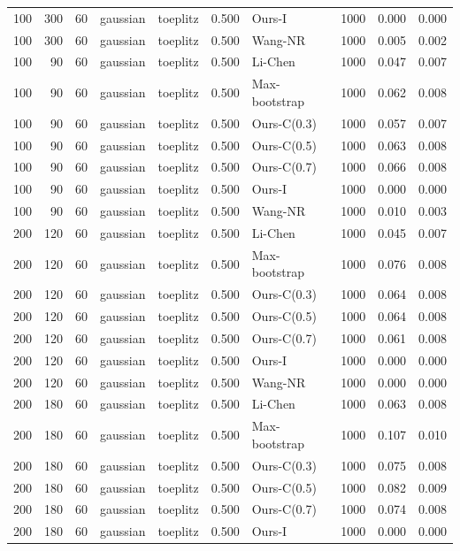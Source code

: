\begin{tabular}{rrrllrlrrr}
100 & 300 & 60 & gaussian & toeplitz & 0.500 & Ours-I & 1000 & 0.000 & 0.000 \\
100 & 300 & 60 & gaussian & toeplitz & 0.500 & Wang-NR & 1000 & 0.005 & 0.002 \\
100 & 90 & 60 & gaussian & toeplitz & 0.500 & Li-Chen & 1000 & 0.047 & 0.007 \\
100 & 90 & 60 & gaussian & toeplitz & 0.500 & Max-bootstrap & 1000 & 0.062 & 0.008 \\
100 & 90 & 60 & gaussian & toeplitz & 0.500 & Ours-C(0.3) & 1000 & 0.057 & 0.007 \\
100 & 90 & 60 & gaussian & toeplitz & 0.500 & Ours-C(0.5) & 1000 & 0.063 & 0.008 \\
100 & 90 & 60 & gaussian & toeplitz & 0.500 & Ours-C(0.7) & 1000 & 0.066 & 0.008 \\
100 & 90 & 60 & gaussian & toeplitz & 0.500 & Ours-I & 1000 & 0.000 & 0.000 \\
100 & 90 & 60 & gaussian & toeplitz & 0.500 & Wang-NR & 1000 & 0.010 & 0.003 \\
200 & 120 & 60 & gaussian & toeplitz & 0.500 & Li-Chen & 1000 & 0.045 & 0.007 \\
200 & 120 & 60 & gaussian & toeplitz & 0.500 & Max-bootstrap & 1000 & 0.076 & 0.008 \\
200 & 120 & 60 & gaussian & toeplitz & 0.500 & Ours-C(0.3) & 1000 & 0.064 & 0.008 \\
200 & 120 & 60 & gaussian & toeplitz & 0.500 & Ours-C(0.5) & 1000 & 0.064 & 0.008 \\
200 & 120 & 60 & gaussian & toeplitz & 0.500 & Ours-C(0.7) & 1000 & 0.061 & 0.008 \\
200 & 120 & 60 & gaussian & toeplitz & 0.500 & Ours-I & 1000 & 0.000 & 0.000 \\
200 & 120 & 60 & gaussian & toeplitz & 0.500 & Wang-NR & 1000 & 0.000 & 0.000 \\
200 & 180 & 60 & gaussian & toeplitz & 0.500 & Li-Chen & 1000 & 0.063 & 0.008 \\
200 & 180 & 60 & gaussian & toeplitz & 0.500 & Max-bootstrap & 1000 & 0.107 & 0.010 \\
200 & 180 & 60 & gaussian & toeplitz & 0.500 & Ours-C(0.3) & 1000 & 0.075 & 0.008 \\
200 & 180 & 60 & gaussian & toeplitz & 0.500 & Ours-C(0.5) & 1000 & 0.082 & 0.009 \\
200 & 180 & 60 & gaussian & toeplitz & 0.500 & Ours-C(0.7) & 1000 & 0.074 & 0.008 \\
200 & 180 & 60 & gaussian & toeplitz & 0.500 & Ours-I & 1000 & 0.000 & 0.000 \\

\end{tabular}
